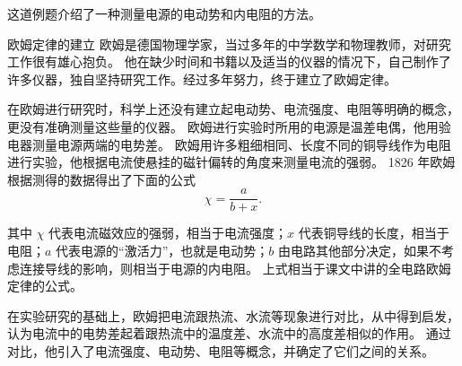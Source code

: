这道例题介绍了一种测量电源的电动势和内电阻的方法。

\begin{Reading}{欧姆定律的建立}
欧姆是德国物理学家，当过多年的中学数学和物理教师，对研究工作很有雄心抱负。
他在缺少时间和书籍以及适当的仪器的情况下，自己制作了许多仪器，独自坚持研究工作。经过多年努力，终于建立了欧姆定律。

在欧姆进行研究时，科学上还没有建立起电动势、电流强度、电阻等明确的概念，更没有准确测量这些量的仪器。
欧姆进行实验时所用的电源是温差电偶，他用验电器测量电源两端的电势差。
欧姆用许多粗细相同、长度不同的铜导线作为电阻进行实验，他根据电流使悬挂的磁针偏转的角度来测量电流的强弱。
1826 年欧姆根据测得的数据得出了下面的公式
\[\chi=\frac{a}{b+x}.\]

其中 $\chi$ 代表电流磁效应的强弱，相当于电流强度；$x$ 代表铜导线的长度，相当于电阻；$a$ 代表电源的“激活力”，也就是电动势；$b$ 由电路其他部分决定，如果不考虑连接导线的影响，则相当于电源的内电阻。
上式相当于课文中讲的全电路欧姆定律的公式。

在实验研究的基础上，欧姆把电流跟热流、水流等现象进行对比，从中得到启发，认为电流中的电势差起着跟热流中的温度差、水流中的高度差相似的作用。
通过对比，他引入了电流强度、电动势、电阻等概念，并确定了它们之间的关系。
\end{Reading}

